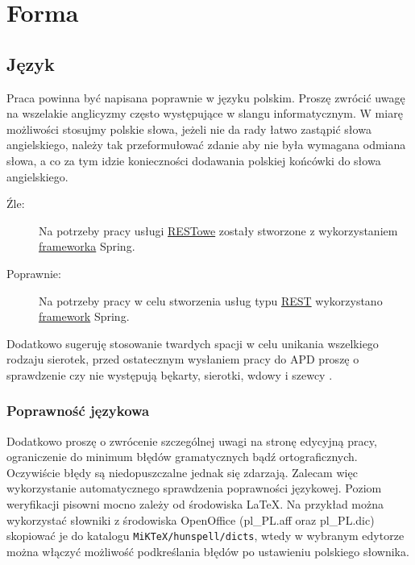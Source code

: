\documentclass[12pt,a4paper]{article}
\begin{document}
\section{Forma}

\subsection{Język}
Praca powinna być napisana poprawnie w języku polskim. Proszę zwrócić uwagę na wszelakie anglicyzmy często występujące w slangu informatycznym. W miarę możliwości stosujmy polskie słowa, jeżeli nie da rady łatwo zastąpić słowa angielskiego, należy tak przeformułować zdanie aby nie była wymagana odmiana słowa, a co za tym idzie konieczności dodawania polskiej końcówki do słowa angielskiego.
\begin{description}
  \item[{\color{red}Źle:}] Na potrzeby pracy usługi \underline{RESTowe} zostały stworzone z wykorzystaniem \underline{frameworka} Spring.
  \item[Poprawnie:] Na potrzeby pracy w celu stworzenia usług typu \underline{REST} wykorzystano \underline{framework} Spring.
\end{description}

Dodatkowo sugeruję stosowanie twardych spacji w celu unikania wszelkiego rodzaju sierotek, przed ostatecznym wysłaniem pracy do APD proszę o sprawdzenie czy nie występują  bękarty, sierotki, wdowy i szewcy \cite{Bekart}.

\subsubsection*{Poprawność językowa}
Dodatkowo proszę o zwrócenie szczególnej uwagi na stronę edycyjną pracy, ograniczenie do minimum błędów gramatycznych bądź ortograficznych. Oczywiście błędy są niedopuszczalne jednak się zdarzają. Zalecam więc wykorzystanie automatycznego sprawdzenia poprawności językowej. Poziom weryfikacji pisowni mocno zależy od środowiska \LaTeX. Na przykład można wykorzystać słowniki z środowiska OpenOffice (pl\_PL.aff oraz pl\_PL.dic) skopiować je  do katalogu {\tt MiKTeX/hunspell/dicts}, wtedy w wybranym edytorze można włączyć możliwość podkreślania błędów po ustawieniu polskiego słownika.
\end{document}
